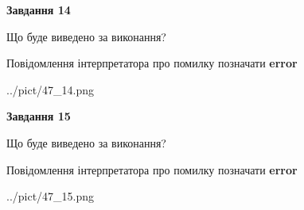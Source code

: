 \documentclass[11pt, ukrainian]{article}
\begin{document}
{\begin {large}
{\begin {center}\textbf{Завдання 14}\end {center}}\par
Що буде виведено за виконання? \par
Повідомлення інтерпретатора про помилку позначати \textbf{error}

\begin{center}
	{../pict/47_14.png}
\end{center}
\newpage

{\begin {center}\textbf{Завдання 15}\end {center}}\par
Що буде виведено за виконання? \par
Повідомлення інтерпретатора про помилку позначати \textbf{error}

\begin{center}
	{../pict/47_15.png}
\end{center}
\newpage

\end {large}}
\end{document}
